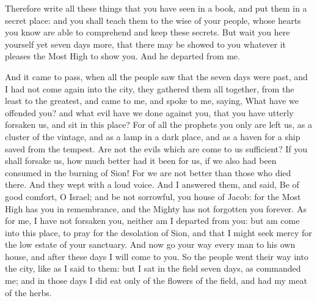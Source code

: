 {Therefore write all these things that you have seen in a book, and put them in a secret place:
and you shall teach them to the wise of your people, whose hearts you know are able to comprehend and keep these secrets.
But wait you here yourself yet seven days more, that there may be showed to you whatever it pleases the Most High to show you. And he departed from me.
\par }{\PP {}And it came to pass, when all the people
 saw that the seven days were past, and I had not come again into the city, they gathered them all together, from the least to the greatest, and came to me, and spoke to me, saying,
What have we offended you? and what evil have we done against you, that you have utterly forsaken us, and sit in this place?
For of all the prophets you only are left us, as a cluster of the vintage, and as a lamp in a dark place, and as a haven for a ship saved from the tempest.
Are not the evils which are come to us sufficient?
If you shall forsake us, how much better had it been for us, if we also had been consumed in the burning of Sion!
For we are not better than those who died there. And they wept with a loud voice. And I answered them, and said,
Be of good comfort, O Israel; and be not sorrowful, you house of Jacob:
for the Most High has you in remembrance, and the Mighty has not forgotten you
 forever.
As for me, I have not forsaken you, neither am I departed from you: but am come into this place, to pray for the desolation of Sion, and that I might seek mercy for the low estate of your sanctuary.
And now go your way every man to his own house, and after these days I will come to you.
So the people went their way into the city, like as I said to them:
but I sat in the field seven days, as
{} commanded me; and in those days I did eat only of the flowers of the field, and had my meat of the herbs.

}
